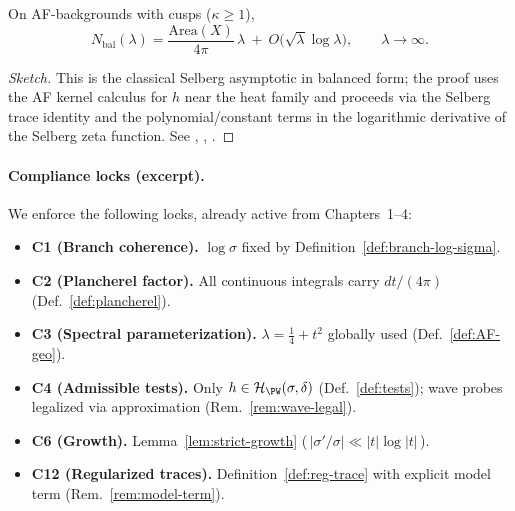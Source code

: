 \begin{theorem}\label{thm:balanced-weyl}
On AF-backgrounds with cusps ($\kappa\ge 1$),
\[
N_{\mathrm{bal}}(\lambda)=\frac{\mathrm{Area}(X)}{4\pi}\,\lambda
\ +\ O\!\big(\sqrt{\lambda}\log\lambda\big),\qquad \lambda\to\infty.
\]
\end{theorem}

\begin{proof}[Sketch]
This is the classical Selberg asymptotic in balanced form; the proof uses
the AF kernel calculus for $h$ near the heat family and proceeds via the
Selberg trace identity and the polynomial/constant terms in the
logarithmic derivative of the Selberg zeta function. See
\cite{SelbergCollected}, \cite{HejhalII}, \cite{Borthwick}.               %
\end{proof}


\paragraph{Compliance locks (excerpt).}
We enforce the following locks, already active from Chapters~1–4:
\begin{itemize}[leftmargin=1.6em]
   \item \textbf{C1 (Branch coherence).} $\log\sigma$ fixed by Definition~\ref{def:branch-log-sigma}.
   \item \textbf{C2 (Plancherel factor).} All continuous integrals carry $dt/(4\pi)$ (Def.~\ref{def:plancherel}).
   \item \textbf{C3 (Spectral parameterization).} $\lambda=\tfrac14+t^2$ globally used (Def.~\ref{def:AF-geo}).
   \item \textbf{C4 (Admissible tests).} Only $h\in\mathcal{H}_{\PW}(\sigma,\delta)$ (Def.~\ref{def:tests}); wave probes legalized via approximation (Rem.~\ref{rem:wave-legal}).
   \item \textbf{C6 (Growth).} Lemma~\ref{lem:strict-growth} (\,$|\sigma'/\sigma|\ll |t|\log|t|$\,).
   \item \textbf{C12 (Regularized traces).} Definition~\ref{def:reg-trace} with explicit model term (Rem.~\ref{rem:model-term}).
\end{itemize}
\relax\hspace{0pt}

